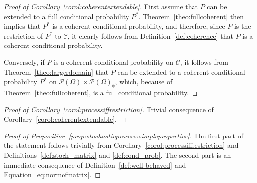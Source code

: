 \documentclass[10pt,a4paper]{paper}
\theoremstyle{definition}
\newcommand{\paths}{\Omega}
\newcommand{\power}{\mathcal{P}(\paths)}
\newcommand{\nonemptypower}{\power_{\emptyset}}
\begin{document}
\begin{proof}[Proof of Corollary~\ref{corol:coherentextendable}]
First assume that $P$ can be extended to a full conditional probability $P^*$. Theorem~\ref{theo:fullcoherent} then implies that $P^*$ is a coherent conditional probability, and therefore, since $P$ is the restriction of $P^*$ to $\mathcal{C}$, it clearly follows from Definition~\ref{def:coherence} that $P$ is a coherent conditional probability.

Conversely, if $P$ is a coherent conditional probability on $\mathcal{C}$, it follows from Theorem~\ref{theo:largerdomain} that $P$ can be extended to a coherent conditional probability $P^*$ on $\power\times\nonemptypower$, which, because of Theorem~\ref{theo:fullcoherent}, is a full conditional probability.
\end{proof}
\begin{proof}[Proof of Corollary~\ref{corol:processiffrestriction}]
Trivial consequence of Corollary~\ref{corol:coherentextendable}.
\end{proof}
\begin{proof}[Proof of Proposition~\ref{prop:stochasticprocess:simpleproperties}]
The first part of the statement follows trivially from Corollary~\ref{corol:processiffrestriction} and Definitions~\ref{def:stoch_matrix} and \ref{def:cond_prob}. The second part is an immediate consequence of Definition~\ref{def:well-behaved} and Equation~\eqref{eq:normofmatrix}.
\end{proof}
\end{document}

